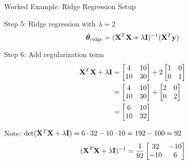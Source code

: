 \documentclass{beamer}
\begin{document}
\begin{frame}{Worked Example: Ridge Regression Setup}
\begin{codebox}{Step 5: Ridge regression with $\lambda = 2$}
$$\hat{\boldsymbol{\theta}}_{\text{ridge}} = (\mathbf{X}^{T}\mathbf{X} + \lambda\mathbf{I})^{-1}(\mathbf{X}^{T}\mathbf{y})$$
\end{codebox}
\pause

\begin{codebox}{Step 6: Add regularization term}
\begin{align*}
\mathbf{X}^{T}\mathbf{X} + \lambda\mathbf{I} &= \begin{bmatrix} 4 & 10 \\ 10 & 30 \end{bmatrix} + 2\begin{bmatrix} 1 & 0 \\ 0 & 1 \end{bmatrix} \\
&= \begin{bmatrix} 4 & 10 \\ 10 & 30 \end{bmatrix} + \begin{bmatrix} 2 & 0 \\ 0 & 2 \end{bmatrix} \\
&= \begin{bmatrix} 6 & 10 \\ 10 & 32 \end{bmatrix}
\end{align*}
\end{codebox}
\pause

Note: $\operatorname{det}(\mathbf{X}^T\mathbf{X} + \lambda\mathbf{I}) = 6 \cdot 32 - 10 \cdot 10 = 192 - 100 = 92$
$$(\mathbf{X}^{T}\mathbf{X} + \lambda\mathbf{I})^{-1} = \frac{1}{92} \begin{bmatrix} 32 & -10 \\ -10 & 6 \end{bmatrix}$$
\end{frame}
\end{document}
